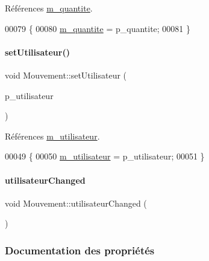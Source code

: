 Références \hyperlink{class_mouvement_ab6040d52ca99ef88d253b1742e70ffd3}{m\+\_\+quantite}.


\begin{DoxyCode}
00079 \{
00080     \hyperlink{class_mouvement_ab6040d52ca99ef88d253b1742e70ffd3}{m\_quantite} = p\_quantite;
00081 \}
\end{DoxyCode}
\mbox{\label{class_mouvement_abd38b265d54e55a4dd897e3270141a84}} 
\paragraph{\texorpdfstring{set\+Utilisateur()}{setUtilisateur()}}
{\footnotesize\ttfamily void Mouvement\+::set\+Utilisateur (\begin{DoxyParamCaption}\item[{Q\+String}]{p\+\_\+utilisateur }\end{DoxyParamCaption})}



Références \hyperlink{class_mouvement_adee253bf00365d1cb4c45bd58d8b3e58}{m\+\_\+utilisateur}.


\begin{DoxyCode}
00049 \{
00050     \hyperlink{class_mouvement_adee253bf00365d1cb4c45bd58d8b3e58}{m\_utilisateur} = p\_utilisateur;
00051 \}
\end{DoxyCode}
\mbox{\label{class_mouvement_a0bfec3a89baffcee5d35e3c3e5a6256a}} 
\paragraph{\texorpdfstring{utilisateur\+Changed}{utilisateurChanged}}
{\footnotesize\ttfamily void Mouvement\+::utilisateur\+Changed (\begin{DoxyParamCaption}{ }\end{DoxyParamCaption})\hspace{0.3cm}{\ttfamily [signal]}}



\subsubsection{Documentation des propriétés}
\mbox{\label{class_mouvement_af0444a7f837bdf252f2a3ccd4eb8a701}} 
